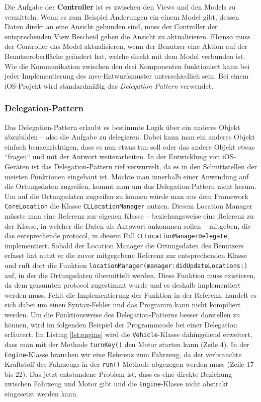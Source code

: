 %
Die Aufgabe der \textbf{Controller} ist es zwischen den Views und den Models zu vermitteln.
Wenn es zum Beispiel Änderungen ein einem Model gibt, dessen Daten direkt an eine Ansicht gebunden sind, muss der Controller der entsprechenden View Bescheid geben die Ansicht zu aktualisieren.
Ebenso muss der Controller das Model aktualisieren, wenn der Benutzer eine Aktion auf der Benutzeroberfläche geändert hat, welche direkt mit dem Model verbunden ist.
Wie die Kommunikation zwischen den drei Komponenten funktioniert kann bei jeder Implementierung des \ac{mvc}-Entwurfsmuster unterschiedlich sein.
Bei einem iOS-Projekt wird standardmäßig das \textit{Delegation-Pattern} verwendet.

\subsubsection{Delegation-Pattern}
Das Delegation-Pattern erlaubt es bestimmte Logik über ein anderes Objekt abzubilden – also die Aufgabe zu delegieren.
Dabei kann man ein anderes Objekt einfach benachrichtigen, dass es nun etwas tun soll oder das andere Objekt etwas ``fragen`` und mit der Antwort weiterarbeiten.
In der Entwicklung von iOS-Geräten ist das Delegation-Pattern tief verwurzelt, da es in den Schnittstellen der meisten Funktionen eingebaut ist.
Möchte man innerhalb einer Anwendung auf die Ortungsdaten zugreifen, kommt man um das Delegation-Pattern nicht herum.\pbreak%
%
Um auf die Ortungsdaten zugreifen zu können würde man aus dem Framework \texttt{CoreLocation} die Klasse \texttt{CLLocationManager} nutzen.
Diesem Location Manager müsste man eine Referenz zur eigenen Klasse – beziehungsweise eine Referenz zu der Klasse, in welcher die Daten als Antowort ankommen sollen – mitgeben, die das entsprechende \Gls{protocol}, in diesem Fall \texttt{CLLocationManagerDelegate}, implementiert.
Sobald der Location Manager die Ortungsdaten des Benutzers erfasst hat nutzt er die zuvor mitgegebene Referenz zur entsprechenden Klasse und ruft dort die Funktion \texttt{locationManager(manager:didUpdateLocations:)} auf, in der die Ortungsdaten übermittelt werden.
Diese Funktion muss existieren, da dem genannten \Gls{protocol} zugestimmt wurde und es deshalb implementiert werden muss.
Fehlt die Implementierung der Funktion in der Referenz, handelt es sich dabei um einen Syntax-Fehler und das Programm kann nicht kompiliert werden.\pbreak%
%
Um die Funktionsweise des Delegation-Patterns besser darstellen zu können, wird im folgenden Beispiel der Programmcode bei einer Delegation erläutert.
Im Listing \ref{lst:engine} wird die \texttt{Vehicle}-Klasse dahingehend erweitert, dass man mit der Methode \texttt{turnKey()} den Motor starten kann (Zeile 4).
In der \texttt{Engine}-Klasse brauchen wir eine Referenz zum Fahrzeug, da der verbrauchte Kraftstoff des Fahrzeugs in der \texttt{run()}-Methode abgezogen werden muss (Zeile 17 bis 22).
Das jetzt entstandene Problem ist, dass es eine direkte Beziehung zwischen Fahrzeug und Motor gibt und die \texttt{Engine}-Klasse nicht abstrakt eingesetzt werden kann.\\

